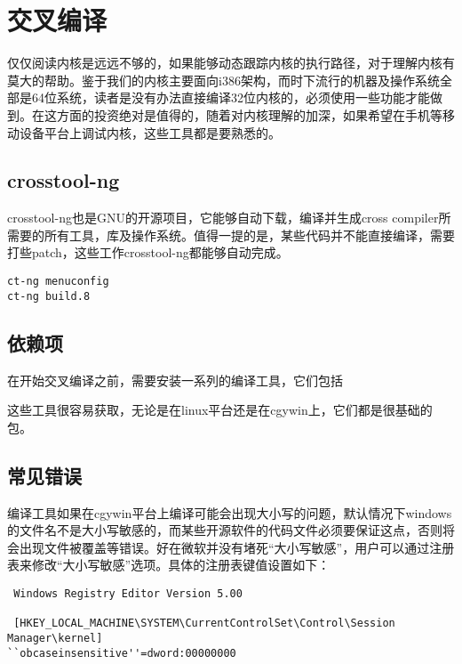 \chapter{交叉编译}
仅仅阅读内核是远远不够的，如果能够动态跟踪内核的执行路径，对于理解内核有莫大的帮助。鉴于我们的内核主要面向i386架构，而时下流行的机器及操作系统全部是64位系统，读者是没有办法直接编译32位内核的，必须使用一些功能才能做到。在这方面的投资绝对是值得的，随着对内核理解的加深，如果希望在手机等移动设备平台上调试内核，这些工具都是要熟悉的。

\section{crosstool-ng}
crosstool-ng也是GNU的开源项目，它能够自动下载，编译并生成cross compiler所需要的所有工具，库及操作系统。值得一提的是，某些代码并不能直接编译，需要打些patch，这些工作crosstool-ng都能够自动完成。

\begin{lstlisting}
ct-ng menuconfig
ct-ng build.8
\end{lstlisting}

\section{依赖项}
在开始交叉编译之前，需要安装一系列的编译工具，它们包括



这些工具很容易获取，无论是在linux平台还是在cgywin上，它们都是很基础的包。

\section{常见错误}
编译工具如果在cgywin平台上编译可能会出现大小写的问题，默认情况下windows的文件名不是大小写敏感的，而某些开源软件的代码文件必须要保证这点，否则将会出现文件被覆盖等错误。好在微软并没有堵死“大小写敏感”，用户可以通过注册表来修改“大小写敏感”选项。具体的注册表键值设置如下：
\begin{lstlisting}
 Windows Registry Editor Version 5.00

 [HKEY_LOCAL_MACHINE\SYSTEM\CurrentControlSet\Control\Session Manager\kernel]
``obcaseinsensitive''=dword:00000000
\end{lstlisting}








